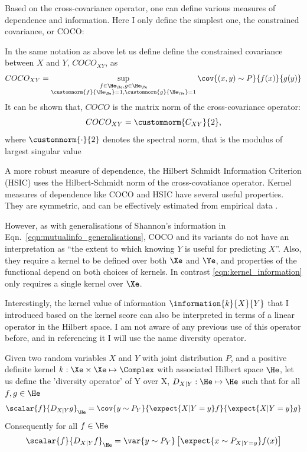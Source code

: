Based on the cross-covariance operator, one can define various measures of dependence and information. Here I only define the simplest one, the constrained covariance, or COCO:

\begin{definition}
	In the same notation as above let us define define the constrained covariance between $X$ and $Y$, $COCO_{XY}$, as
	\begin{equation}
		COCO_{XY}=\sup_{\substack{f\in\He_\Xe, g\in\He_\Ye \\\customnorm{f}{\He_\Xe}=1,\customnorm{g}{\He_\Ye}=1}} \cov{(x,y)\sim P}{f(x)}{g(y)}
	\end{equation}
	It can be shown that, $COCO$ is the matrix norm of the cross-covariance operator:
	\begin{equation}
		COCO_{XY} = \customnorm{C_{XY}}{2},
	\end{equation}
	where $\customnorm{\cdot}{2}$ denotes the spectral norm, that is the modulus of largest singular value \citep{Gretton2005COCO}
\end{definition}

A more robust measure of dependence, the Hilbert Schmidt Information Criterion (HSIC) uses the Hilbert-Schmidt norm of the cross-covatiance operator\citep{Gretton2005HSIC}. Kernel measures of dependence like COCO and HSIC have several useful properties. They are symmetric, and can be effectively estimated from empirical data \citep{Gretton2005HSIC}.

However, as with generalisations of Shannon's information in Eqn.\ \eqref{eqn:mutualinfo_generalisations}, COCO and its variants do not have an interpretation as ``the extent to which knowing $Y$ is useful for predicting $X$''. Also, they require a kernel to be defined over both $\Xe$ and $\Ye$, and properties of the functional depend on both choices of kernels. In contrast \eqref{eqn:kernel_information} only requires a single kernel over $\Xe$.

Interestingly, the kernel value of information $\information{k}{X}{Y}$ that I introduced based on the kernel score can also be interpreted in terms of a linear operator in the Hilbert space. I am not aware of any previous use of this operator before, and in referencing it I will use the name diversity operator.

\begin{definition}
Given two random variables $X$ and $Y$ with joint distribution $P$, and a positive definite kernel $k:\Xe\times\Xe\mapsto\Complex$ with associated Hilbert space $\He$, let us define the 'diversity operator' of Y over X, $D_{X\vert Y}:\He\mapsto\He$ such that for all $f,g\in\He$ 
\begin{align}
	\scalar{f}{D_{X\vert Y}g}_{\He} = \cov{y\sim P_Y}{\expect{X\vert Y=y} f}{\expect{X\vert Y=y} g}
\end{align}
Consequently for all $f\in\He$
\begin{align}
	\scalar{f}{D_{X\vert Y}f}_{\He} = \var{y\sim P_Y} \left[ \expect{x\sim P_{X\vert Y=y}} f(x) \right]
\end{align}
\end{definition}


